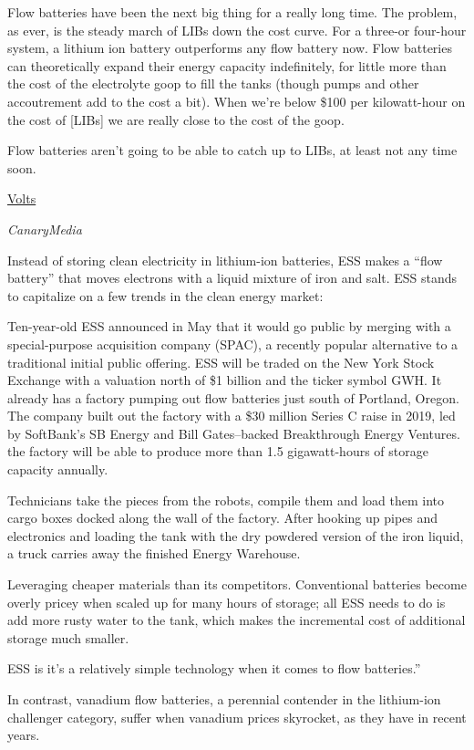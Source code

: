 \documentclass[
]{book}
\begin{document}
Flow batteries have been the next big thing for a really long time.
The problem, as ever, is the steady march of LIBs down the cost curve.
For a three-or four-hour system, a lithium ion battery outperforms any flow battery now.
Flow batteries can theoretically expand their energy capacity indefinitely, for little more than the cost of the electrolyte goop to fill the tanks (though pumps and other accoutrement add to the cost a bit).
When we're below \$100 per kilowatt-hour on the cost of {[}LIBs{]} we are really close to the cost of the goop.

Flow batteries aren't going to be able to catch up to LIBs, at least not any time soon.

\href{https://www.volts.wtf/p/battery-week-competitors-to-lithium}{Volts}

\emph{CanaryMedia}

Instead of storing clean electricity in lithium-ion batteries, ESS makes a ``flow battery'' that moves electrons with a liquid mixture of iron and salt. ESS stands to capitalize on a few trends in the clean energy market:

Ten-year-old ESS announced in May that it would go public by merging with a special-purpose acquisition company (SPAC), a recently popular alternative to a traditional initial public offering.
ESS will be traded on the New York Stock Exchange with a valuation north of \$1 billion and the ticker symbol GWH.
It already has a factory pumping out flow batteries just south of Portland, Oregon.
The company built out the factory with a \$30 million Series C raise in 2019, led by SoftBank's SB Energy and Bill Gates--backed Breakthrough Energy Ventures.
the factory will be able to produce more than 1.5 gigawatt-hours of storage capacity annually.

Technicians take the pieces from the robots, compile them and load them into cargo boxes docked along the wall of the factory. After hooking up pipes and electronics and loading the tank with the dry powdered version of the iron liquid, a truck carries away the finished Energy Warehouse.

Leveraging cheaper materials than its competitors.
Conventional batteries become overly pricey when scaled up for many hours of storage; all ESS needs to do is add more rusty water to the tank, which makes the incremental cost of additional storage much smaller.

ESS is it's a relatively simple technology when it comes to flow batteries.''

In contrast, vanadium flow batteries, a perennial contender in the lithium-ion challenger category, suffer when vanadium prices skyrocket, as they have in recent years.
\end{document}
